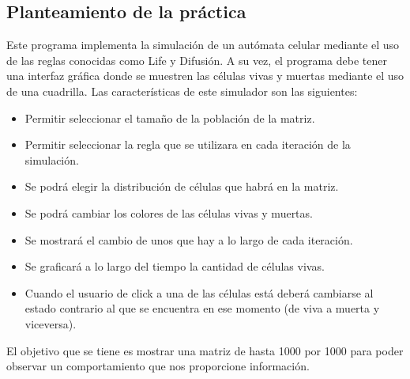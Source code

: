 \subsection{Planteamiento de la práctica}
	Este programa implementa la simulación de un autómata celular mediante el uso de las reglas conocidas como Life y Difusión. A su vez, el programa debe tener una interfaz gráfica donde se muestren las células vivas y muertas mediante el uso de una cuadrilla.
	Las características de este simulador son las siguientes:
	\begin{itemize}
		\item Permitir seleccionar el tamaño de la población de la matriz.
		\item Permitir seleccionar la regla que se utilizara en cada iteración de la simulación.
		\item Se podrá elegir la distribución de células que habrá en la matriz.
		\item Se podrá cambiar los colores de las células vivas y muertas.
		\item Se mostrará el cambio de unos que hay a lo largo de cada iteración.
		\item Se graficará a lo largo del tiempo la cantidad de células vivas.
		\item Cuando el usuario de click a una de las células está deberá cambiarse al estado contrario al que se encuentra en ese momento (de viva a muerta y viceversa).
	\end{itemize}
	El objetivo que se tiene es mostrar una matriz de hasta 1000 por 1000 para poder observar un comportamiento que nos proporcione información.